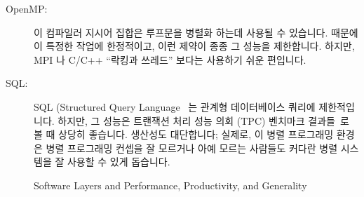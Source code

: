 \begin{description}
\item[OpenMP:] 이 컴파일러 지시어 집합은 루프문을 병렬화 하는데 사용될 수
	있습니다.
	때문에 이 특정한 작업에 한정적이고, 이런 제약이 종종 그 성능을
	제한합니다.
	하지만, MPI 나 C/C++ ``락킹과 쓰레드'' 보다는 사용하기 쉬운 편입니다.

\item[SQL:] SQL (Structured Query Language~\cite{DIS9075SQL92} 는 관계형
	데이터베이스 쿼리에 제한적입니다.
	하지만, 그 성능은 트랜잭션 처리 성능 의회 (TPC) 벤치마크
	결과들~\cite{TPC}로 볼 때 상당히 좋습니다.
	생산성도 대단합니다; 실제로, 이 병렬 프로그래밍 환경은 병렬 프로그래밍
	컨셉을 잘 모르거나 아예 모르는 사람들도 커다란 병렬 시스템을 잘 사용할
	수 있게 돕습니다.

\end{description}

\begin{figure}[tb]
\centering
{}
\caption{Software Layers and Performance, Productivity, and Generality}
\label{fig:intro:Software Layers and Performance, Productivity, and Generality}
\end{figure}

